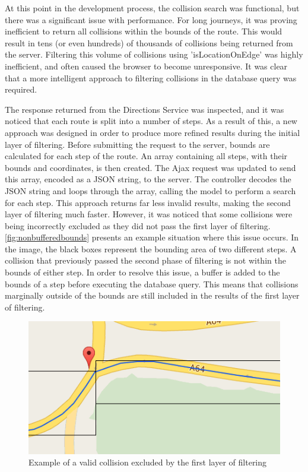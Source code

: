 \documentclass[authoryearcitations]{UoYCSproject}
\begin{document}
At this point in the development process, the collision search was functional, but there was a significant issue with performance. For long journeys, it was proving inefficient to return all collisions within the bounds of the route. This would result in tens (or even hundreds) of thousands of collisions being returned from the server. Filtering this volume of collisions using 'isLocationOnEdge' was highly inefficient, and often caused the browser to become unresponsive. It was clear that a more intelligent approach to filtering collisions in the database query was required.

The response returned from the Directions Service was inspected, and it was noticed that each route is split into a number of steps. As a result of this, a new approach was designed in order to produce more refined results during the initial layer of filtering. Before submitting the request to the server, bounds are calculated for each step of the route. An array containing all steps, with their bounds and coordinates, is then created. The Ajax request was updated to send this array, encoded as a JSON string, to the server. The controller decodes the JSON string and loops through the array, calling the model to perform a search for each step. This approach returns far less invalid results, making the second layer of filtering much faster. However, it was noticed that some collisions were being incorrectly excluded as they did not pass the first layer of filtering. \autoref{fig:nonbufferedbounds} presents an example situation where this issue occurs. In the image, the black boxes represent the bounding area of two different steps. A collision that previously passed the second phase of filtering is not within the bounds of either step. In order to resolve this issue, a buffer is added to the bounds of a step before executing the database query. This means that collisions marginally outside of the bounds are still included in the results of the first layer of filtering.

\begin{figure}
	\center
	\includegraphics[scale=0.7]{nonbufferedbounds}
	\caption{Example of a valid collision excluded by the first layer of filtering}
	\label{fig:nonbufferedbounds}
\end{figure}
\end{document}

